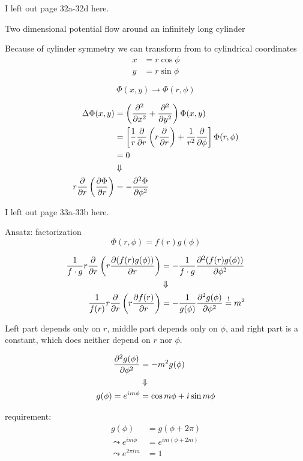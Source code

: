 \begin{shaded}
I left out page 32a-32d here.
\end{shaded}

Two dimensional potential flow around an infinitely long cylinder 

Because of cylinder symmetry we can transform from  to cylindrical coordinates
\begin{align}
x &= r\cos\phi\\
y &= r\sin\phi
\end{align}

\begin{equation}
\Phi(x,y) \rightarrow \Phi(r,\phi)
\end{equation}

\begin{align}
\Delta\Phi(x,y) &= \left(\frac{\partial^2 }{\partial x^2}+\frac{\partial^2 }{\partial y^2}\right)\Phi(x,y) \\
&= \left[\frac{1}{r}\frac{\partial }{\partial r}\left(r\frac{\partial }{\partial r}\right) + \frac{1}{r^2}\frac{\partial }{\partial \phi}\right]\Phi(r,\phi)\\
&= 0\\
&\Downarrow\notag\\
r\frac{\partial }{\partial r}\left(\frac{\partial \Phi}{\partial r}\right) &= -\frac{\partial^2 \Phi}{\partial \phi^2}
\end{align}

\begin{shaded}
I left out page 33a-33b here.
\end{shaded}

Ansatz: factorization
\begin{equation}
\Phi(r,\phi) = f(r)g(\phi)
\end{equation}

\begin{align}
\frac{1}{f\cdot g} r\frac{\partial }{\partial r}\left(r\frac{\partial (f(r)g(\phi))}{\partial r}\right) &= -\frac{1}{f\cdot g}\frac{\partial^2 (f(r)g(\phi))}{\partial \phi^2} \\
&\Downarrow\notag\\
\frac{1}{f(r)}r\frac{\partial }{\partial r}\left(r\frac{\partial f(r)}{\partial r}\right) &= -\frac{1}{g(\phi)}\frac{\partial^2 g(\phi)}{\partial \phi^2} \overset{!}{=} m^2
\end{align}

Left part depends only on $r$, middle part depends only on $\phi$, and right part is a constant, which does neither depend on $r$ nor $\phi$.

\begin{align}
\frac{\partial^2 g(\phi)}{\partial \phi^2} &= -m^2g(\phi)\\
&\Downarrow\notag\\
g(\phi) = e^{im\phi} &=  \cos m\phi + i\sin m\phi
\end{align}

requirement:
\begin{align}
g(\phi) &= g(\phi+2\pi)\\
\leadsto
e^{im\phi} &= e^{im(\phi+2m)}\\
\leadsto
e^{2\pi im} &= 1
\end{align}

